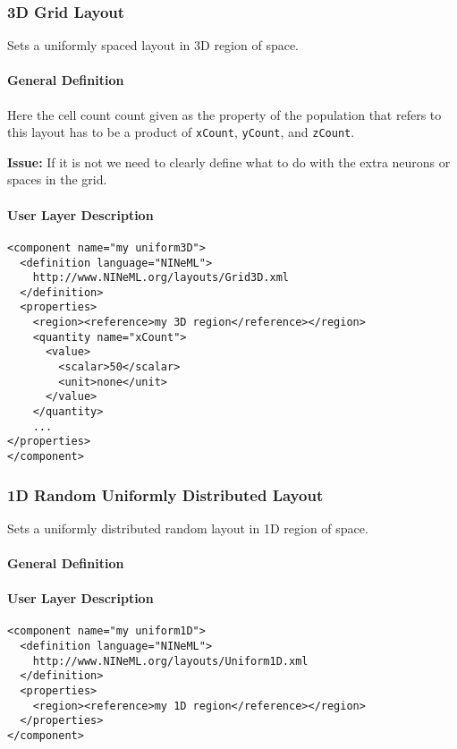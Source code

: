 \documentclass{article}
\newcommand{\issue}[1]{%
\begin{center}
\colorbox{issuecolor}{\parbox{0.8\linewidth}{\textbf{Issue:} #1}}
\end{center}%
}
\begin{document}
\subsubsection{3D Grid Layout}

Sets a uniformly spaced layout in 3D region of space.

\paragraph{General Definition}
Here the cell count count given as the property of the population that refers to this layout
has to be a product of {\tt xCount}, {\tt yCount}, and {\tt zCount}.

\issue{If it is not we need to clearly define what to do with the extra neurons or spaces
in the grid.}

\paragraph{User Layer Description}
\begin{verbatim}
<component name="my uniform3D">
  <definition language="NINeML">
    http://www.NINeML.org/layouts/Grid3D.xml
  </definition>
  <properties>
    <region><reference>my 3D region</reference></region>
    <quantity name="xCount">
      <value>
        <scalar>50</scalar>
        <unit>none</unit>
      </value>
    </quantity>
    ...
</properties>
</component>
\end{verbatim}

\subsubsection{1D Random Uniformly Distributed Layout}

Sets a uniformly distributed random layout in 1D region of space.

\paragraph{General Definition}

\paragraph{User Layer Description}
\begin{verbatim}
<component name="my uniform1D">
  <definition language="NINeML">
    http://www.NINeML.org/layouts/Uniform1D.xml
  </definition>
  <properties>
    <region><reference>my 1D region</reference></region>
  </properties>
</component>
\end{verbatim}
\end{document}
